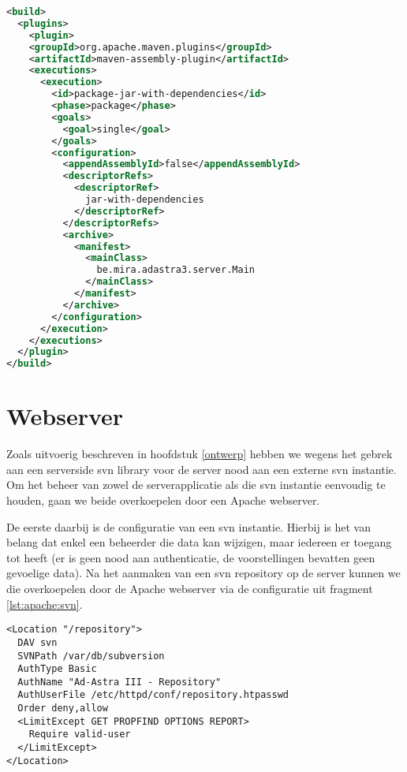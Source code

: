 \begin{lstlisting}[language=XML, float, caption=Gebruik van Maven modules om een executable te compileren., label=lst:fatjar]
<build>
  <plugins>
    <plugin>
    <groupId>org.apache.maven.plugins</groupId>
    <artifactId>maven-assembly-plugin</artifactId>
    <executions>
      <execution>
        <id>package-jar-with-dependencies</id>
        <phase>package</phase>
        <goals>
          <goal>single</goal>
        </goals>
        <configuration>
          <appendAssemblyId>false</appendAssemblyId>
          <descriptorRefs>
            <descriptorRef>
              jar-with-dependencies
            </descriptorRef>
          </descriptorRefs>
          <archive>
            <manifest>
              <mainClass>
                be.mira.adastra3.server.Main
              </mainClass>
            </manifest>
          </archive>
        </configuration>
      </execution>
    </executions>
  </plugin>
</build>
\end{lstlisting}


\section{Webserver}

Zoals uitvoerig beschreven in hoofdstuk \ref{ontwerp} hebben we wegens het gebrek aan een serverside \ac{svn} library voor de server nood aan een externe \ac{svn} instantie. Om het beheer van zowel de serverapplicatie als die \ac{svn} instantie eenvoudig te houden, gaan we beide overkoepelen door een Apache webserver.

De eerste daarbij is de configuratie van een \ac{svn} instantie. Hierbij is het van belang dat enkel een beheerder die data kan wijzigen, maar iedereen er toegang tot heeft (er is geen nood aan authenticatie, de voorstellingen bevatten geen gevoelige data). Na het aanmaken van een \ac{svn} repository op de server kunnen we die overkoepelen door de Apache webserver via de configuratie uit fragment \ref{lst:apache:svn}.

\begin{lstlisting}[language=ApacheConfig, caption=Configuratie van Apache om een \ac{svn} server te overkoepelen., label=lst:apache:svn]
<Location "/repository">
  DAV svn
  SVNPath /var/db/subversion
  AuthType Basic
  AuthName "Ad-Astra III - Repository"
  AuthUserFile /etc/httpd/conf/repository.htpasswd
  Order deny,allow
  <LimitExcept GET PROPFIND OPTIONS REPORT>
    Require valid-user
  </LimitExcept>
</Location>
\end{lstlisting}

